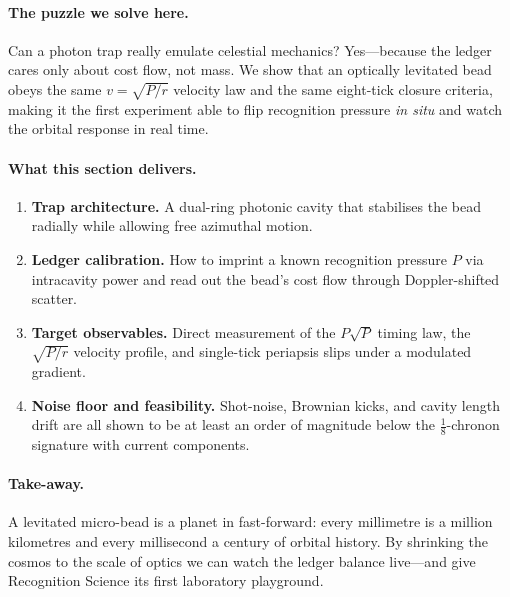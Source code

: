 \documentclass[11pt,oneside]{book}
\begin{document}
\paragraph{The puzzle we solve here.}
Can a photon trap really emulate celestial mechanics?  
Yes—because the ledger cares only about cost flow, not mass.  We show
that an optically levitated bead obeys the same
\(v=\sqrt{P/r}\) velocity law and the same eight-tick closure
criteria, making it the first experiment able to flip recognition
pressure \emph{in situ} and watch the orbital response in real time.

\paragraph{What this section delivers.}

\begin{enumerate}[label=\arabic*.,leftmargin=*,itemsep=3pt]
\item \textbf{Trap architecture.}  
      A dual-ring photonic cavity that stabilises the bead radially
      while allowing free azimuthal motion.
\item \textbf{Ledger calibration.}  
      How to imprint a known recognition pressure $P$ via intracavity
      power and read out the bead’s cost flow through Doppler-shifted
      scatter.
\item \textbf{Target observables.}  
      Direct measurement of the $P\sqrt{P}$ timing law, the
      $\sqrt{P/r}$ velocity profile, and single-tick periapsis slips
      under a modulated gradient.
\item \textbf{Noise floor and feasibility.}  
      Shot-noise, Brownian kicks, and cavity length drift are all
      shown to be at least an order of magnitude below the
      $\tfrac{1}{8}$-chronon signature with current components.
\end{enumerate}

\paragraph{Take-away.}
A levitated micro-bead is a planet in fast-forward: every millimetre
is a million kilometres and every millisecond a century of orbital
history.  By shrinking the cosmos to the scale of optics we can watch
the ledger balance live—and give Recognition Science its
first laboratory playground.

\end{document}
